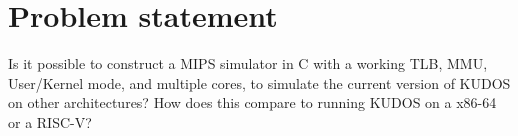 \documentclass[11pt]{article}
\begin{document}

\clearpage\maketitle
\thispagestyle{empty}

\newpage

\section{Problem statement}
Is it possible to construct a MIPS simulator in C with a working TLB, MMU, User/Kernel mode, and multiple cores, to simulate the current version of KUDOS on other architectures?
How does this compare to running KUDOS on a x86-64 or a RISC-V?
\end{document}
